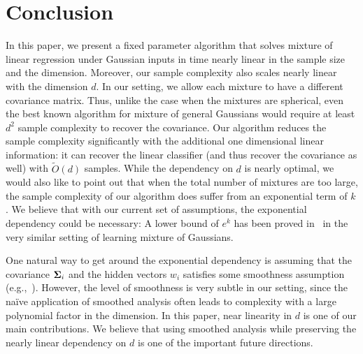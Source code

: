 \section{Conclusion} \label{sec:conclusion}


In this paper, we present a fixed parameter algorithm that solves mixture of linear regression under Gaussian inputs in time nearly linear in the sample size and the dimension. Moreover, our sample complexity also scales nearly linear with the dimension $d$. In our setting, we allow each mixture to have a different covariance matrix. Thus, unlike the case when the mixtures are spherical, even the best known algorithm for mixture of general Gaussians would require at least $d^2$ sample complexity to recover the covariance. Our algorithm reduces the sample complexity significantly with the additional one dimensional linear information: it can recover the linear classifier (and thus recover the covariance as well) with $\tilde{O}(d)$ samples.  While the dependency on $d$ is nearly optimal, we would also like to point out that when the total number of mixtures are too large, the sample complexity of our algorithm does suffer from an exponential term of $k$. We believe that with our current set of assumptions, the exponential dependency could be necessary: A lower bound of $e^{k}$ has been proved in~\citep{moitra2010settling} in the very similar setting of learning mixture of Gaussians. 


One natural way to get around the exponential dependency is assuming that the covariance $\bold{\Sigma}_i$ and the hidden vectors $w_i$ satisfies some smoothness assumption (e.g.,~\citep{ge2015learning}). However, the level of smoothness is very subtle in our setting, since the na\"ive application of smoothed analysis often leads to complexity with a large polynomial factor in the dimension. In this paper, near linearity in $d$ is one of our main contributions. We believe that using smoothed analysis while preserving the nearly linear dependency on $d$ is one of the important future directions. 

